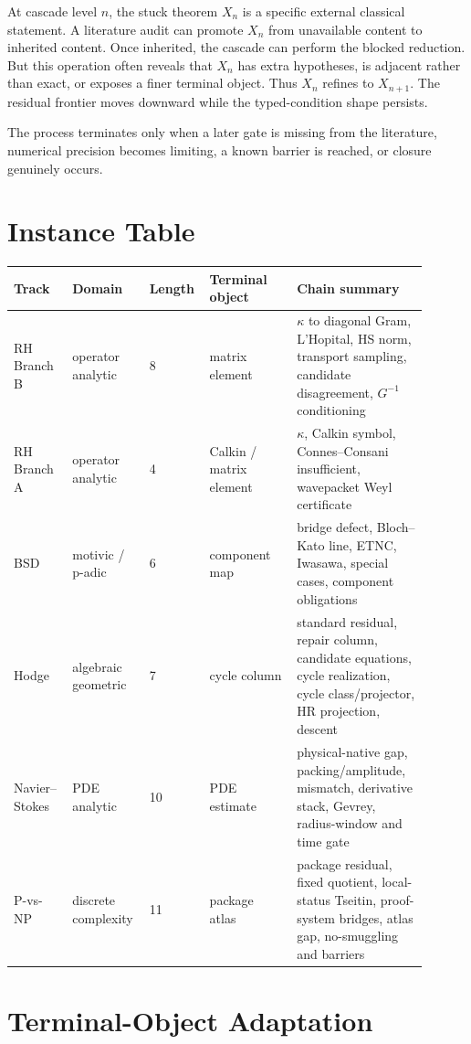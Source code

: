 \documentclass{article}
\begin{document}
At cascade level \(n\), the stuck theorem \(X_n\) is a specific external classical statement. A literature audit can promote \(X_n\) from unavailable content to inherited content. Once inherited, the cascade can perform the blocked reduction. But this operation often reveals that \(X_n\) has extra hypotheses, is adjacent rather than exact, or exposes a finer terminal object. Thus \(X_n\) refines to \(X_{n+1}\). The residual frontier moves downward while the typed-condition shape persists.

The process terminates only when a later gate is missing from the literature, numerical precision becomes limiting, a known barrier is reached, or closure genuinely occurs.

\section{Instance Table}

\begin{tabular}{p{0.13\linewidth}p{0.16\linewidth}p{0.11\linewidth}p{0.20\linewidth}p{0.30\linewidth}}
\toprule
Track & Domain & Length & Terminal object & Chain summary\\
\midrule
RH Branch B & operator analytic & 8 & matrix element & \(\kappa\) to diagonal Gram, L'Hopital, HS norm, transport sampling, candidate disagreement, \(G^{-1}\) conditioning\\
RH Branch A & operator analytic & 4 & Calkin / matrix element & \(\kappa\), Calkin symbol, Connes--Consani insufficient, wavepacket Weyl certificate\\
BSD & motivic / p-adic & 6 & component map & bridge defect, Bloch--Kato line, ETNC, Iwasawa, special cases, component obligations\\
Hodge & algebraic geometric & 7 & cycle column & standard residual, repair column, candidate equations, cycle realization, cycle class/projector, HR projection, descent\\
Navier--Stokes & PDE analytic & 10 & PDE estimate & physical-native gap, packing/amplitude, mismatch, derivative stack, Gevrey, radius-window and time gate\\
P-vs-NP & discrete complexity & 11 & package atlas & package residual, fixed quotient, local-status Tseitin, proof-system bridges, atlas gap, no-smuggling and barriers\\
\bottomrule
\end{tabular}

\section{Terminal-Object Adaptation}
\end{document}
